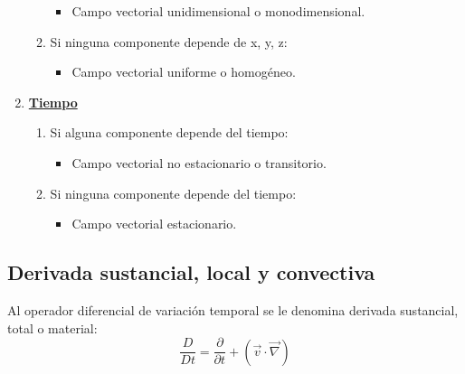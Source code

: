 \begin{enumerate}
\begin{enumerate}
		\begin{itemize}
			\item Campo vectorial unidimensional o monodimensional.
		\end{itemize}
		\item Si ninguna componente depende de x, y, z: 
		\begin{itemize}
			\item Campo vectorial uniforme o homogéneo.
		\end{itemize}
	\end{enumerate}
	\item \underline{\textbf{Tiempo}}
	\begin{enumerate}
		\item Si alguna componente depende del tiempo:
		\begin{itemize}
			\item Campo vectorial no estacionario o transitorio.
		\end{itemize}
		\item Si ninguna componente depende del tiempo:
		\begin{itemize}
			\item Campo vectorial estacionario.
		\end{itemize}
	\end{enumerate}
\end{enumerate}
\subsection{Derivada sustancial, local y convectiva}
Al operador diferencial de variación temporal se le denomina derivada sustancial, total o material:
\[\frac{D}{Dt}=\frac{\partial}{\partial t}+\left(\vec{v} \cdot \vec{\nabla}\right)\]



